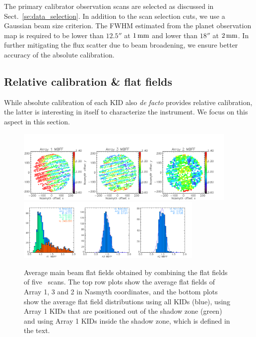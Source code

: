 The primary calibrator observation scans are selected as discussed in
Sect.~\ref{se:data_selection}. In addition to the scan selection cuts,
we use a Gaussian beam size criterion. The FWHM estimated from the planet
observation map is required to be lower than $12.5''$ at $1\,\rm{mm}$ and lower
than $18''$ at $2\,\rm{mm}$. In further mitigating the flux scatter
due to beam broadening, we ensure better accuracy of the absolute
calibration.



\subsection{Relative calibration \& flat fields}
\label{se:flat_field}
While absolute calibration of each KID also \emph{de facto} provides
relative calibration, the latter is interesting in itself to
characterize the instrument. We focus on this aspect in this
section.

\begin{figure}[!thbp] 
\begin{center}
  \includegraphics[width=0.95\textwidth]{Figures/Average_main_beam_flat_field_N2R9_10.png}
  \includegraphics[width=0.8\textwidth]{Figures/Histo_average_main_beam_flat_field_N2R9_10.png}
\caption[Average main beam flat fields]{Average main beam flat fields
  obtained by combining the flat fields of five
  \bm\ scans. The top row plots show the average flat fields of Array
  1, 3 and 2 in Nasmyth coordinates, and the bottom plots
  show the average flat field distributions using all KIDs (blue),
  using Array 1 KIDs that are positioned out of the shadow zone
  (green) and using Array 1 KIDs inside the shadow zone, which is
  defined in the text.}
 \label{fig:avg_mbff}
\end{center}
\end{figure}

